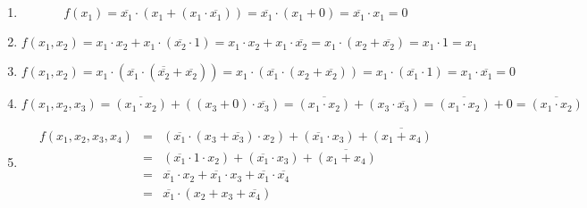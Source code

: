 \documentclass[DIN, pagenumber=false, fontsize=11pt, parskip=half]{scrartcl}
\begin{document}
    \subsection{}
    \begin{enumerate}[label=(\alph*)]
        \item
            \begin{equation*}
                f(x_1) = \overline{x_1} \cdot (x_1 + (x_1 \cdot \overline{x_1})) = \overline{x_1} \cdot (x_1 + 0) = \overline{x_1} \cdot x_1 = 0
            \end{equation*}
        \item 
            \begin{equation*}
                f(x_1, x_2) = x_1 \cdot x_2 + x_1 \cdot (\overline{x_2} \cdot 1) = x_1 \cdot x_2 + x_1 \cdot \overline{x_2} = x_1 \cdot (x_2 + \overline{x_2})
                = x_1 \cdot 1 = x_1
            \end{equation*}
        \item 
            \begin{equation*}
                f(x_1, x_2) = x_1 \cdot (\overline{x_1} \cdot (\overline{\overline{x_2}} + \overline{x_2})) = 
                    x_1 \cdot (\overline{x_1} \cdot (x_2 + \overline{x_2})) = x_1 \cdot (\overline{x_1} \cdot 1) =
                    x_1 \cdot \overline{x_1} = 0
            \end{equation*}
        \item 
            \begin{equation*}
                f(x_1, x_2, x_3) = \overline{(x_1 \cdot x_2)} + ((x_3 + 0) \cdot \overline{x_3})
                = \overline{(x_1 \cdot x_2)} + (x_3 \cdot \overline{x_3})
                = \overline{(x_1 \cdot x_2)} + 0
                = \overline{(x_1 \cdot x_2)}
            \end{equation*}
        \item 
            \begin{eqnarray*}
                f(x_1, x_2, x_3, x_4) &=& (\overline{x_1} \cdot (x_3 + \overline{x_3}) \cdot x_2) + (\overline{x_1} \cdot x_3) + \overline{(x_1 + x_4)} \\
                &=& (\overline{x_1} \cdot 1 \cdot x_2) + (\overline{x_1} \cdot x_3) + \overline{(x_1 + x_4)} \\
                &=& \overline{x_1} \cdot x_2 + \overline{x_1} \cdot x_3 + \overline{x_1} \cdot \overline{x_4} \\
                &=& \overline{x_1} \cdot (x_2 + x_3 +  \overline{x_4})
            \end{eqnarray*}
    \end{enumerate}
\end{document}
